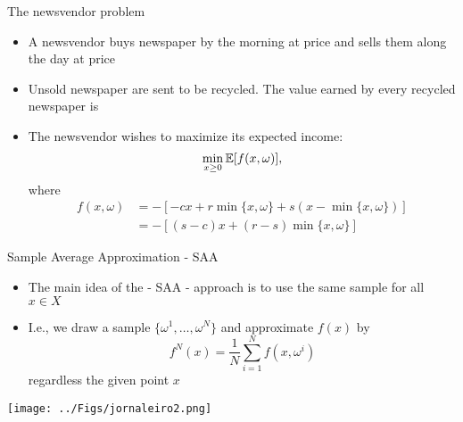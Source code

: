 \begin{frame}{The newsvendor problem}

\begin{itemize}


\item A newsvendor buys newspaper  by the morning at price  and sells them along the day at price 
\pula

\item Unsold newspaper are sent to be recycled. The value earned by every recycled newspaper is 
\pula

\item The newsvendor wishes to maximize its expected income:
\[
\min_{x\geq 0} \mathbb{E}[f(x,\omega)],
\]
where
\[
\begin{array}{lll}
f(x,\omega) &= -[-cx + r\min\{x,\omega\} +  s(x - \min\{x,\omega\})]\\
&=
-[(s-c)x + (r-s)\min\{x,\omega\}]
\end{array}
\]
\end{itemize}

 \end{frame} 









 
 

\begin{frame}{Sample Average Approximation - SAA}

\begin{itemize}
\item The main idea of the  - SAA - approach is to use the same sample for all $x \in X$
\pula

\item I.e., we draw a sample $\{\omega^1,\ldots, \omega^N\}$ and approximate $f(x)$ by
\[
f^N(x) = \frac{1}{N}\sum_{i=1}^N f(x,\omega^i)
\]
regardless the given point $x$
\end{itemize}
\begin{center}
\texttt{[image: ../Figs/jornaleiro2.png]} {}
\end{center}
 \end{frame} 




